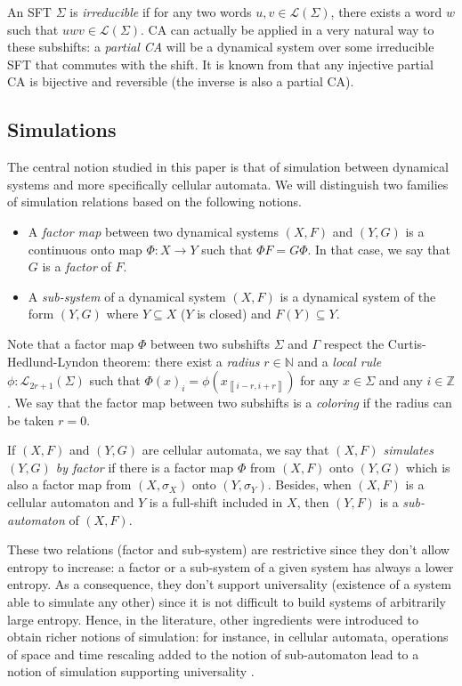\documentclass{jac}
\let\dfn\emph
\newcommand{\Z}{\mathbb Z}
\newcommand{\N}{\mathbb N}
\newcommand{\oo}[2]{\left\rrbracket #1,#2\right\llbracket}
\newcommand{\cc}[2]{\left\llbracket #1,#2\right\rrbracket}
\newcommand{\scc}[2]{_{\cc{#1}{#2}}}\newcommand{\soo}[2]{_{\oo{#1}{#2}}}\newcommand{\co}[2]{\left\llbracket #1,#2\right\llbracket}\newcommand{\sco}[2]{_{\co{#1}{#2}}}\newcommand{\kaprx}[1]{\mathcal A_{#1}}
\newcommand{\lang}{\mathcal L}
\theoremstyle{definition}
\begin{document}
An SFT $\Sigma$ is \dfn{irreducible} if for any two words $u,v\in\lang(\Sigma)$, there exists a word $w$ such that $uwv\in\lang(\Sigma)$.
CA can actually be applied in a very natural way to these subshifts: a \dfn{partial CA} will be a dynamical system over some irreducible SFT that commutes with the shift. It is known from \cite{edensof} that any injective partial CA is bijective and reversible (the inverse is also a partial CA).



\subsection{Simulations}

The central notion studied in this paper is that of simulation between dynamical
systems and more specifically cellular automata. We will distinguish two
families of simulation relations based on the following notions.

\begin{defi}\leavevmode \begin{itemize}
  \item A \dfn{factor map} between two dynamical systems $(X,F)$ and $(Y,G)$ is a
    continuous onto map $\Phi:X\to Y$ such that $\Phi F=G\Phi$.
    In that case, we say that $G$ is a \dfn{factor} of $F$. 
  \item A \dfn{sub-system} of a dynamical system $(X,F)$ is a dynamical system of
    the form $(Y,G)$ where ${Y\subseteq X}$ ($Y$ is closed) and ${F(Y)\subseteq Y}$.
\end{itemize}
\end{defi}

Note that a factor map $\Phi$ between two subshifts $\Sigma$ and $\Gamma$ respect the Curtis-Hedlund-Lyndon theorem: there exist a \dfn{radius} $r\in\N$ and a \dfn{local rule} $\phi:\lang_{2r+1}(\Sigma)$ such that $\Phi(x)_i=\phi(x\scc{i-r}{i+r})$ for any $x\in\Sigma$ and any $i\in\Z$. We say that the factor map between two subshifts is a \dfn{coloring} if the radius can be taken $r=0$.

If $(X,F)$ and $(Y,G)$ are cellular automata, we say that \emph{$(X,F)$ simulates $(Y,G)$ by factor} if there is a factor map $\Phi$ from $(X,F)$ onto $(Y,G)$ which is also a factor map from $(X,\sigma_X)$ onto $(Y,\sigma_Y)$.
Besides, when $(X,F)$ is a cellular automaton and $Y$ is a full-shift included in $X$, then $(Y,F)$ is a \dfn{sub-automaton} of $(X,F)$. 

These two relations (factor and sub-system) are restrictive since they don't allow entropy to increase: a factor or a sub-system of a given system has always a lower entropy. As a consequence, they don't support universality (existence of a system able to simulate any other) since it is not difficult to build systems of arbitrarily large entropy. Hence, in the literature, other ingredients were introduced to obtain richer notions of simulation: for instance, in cellular automata, operations of space and time rescaling added to the notion of sub-automaton lead to a notion of simulation supporting universality \cite{bulk1,bulk2}. 
 
\end{document}
